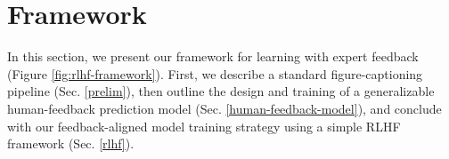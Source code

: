 \documentclass[11pt]{article}
\newcommand{\rev}[1]{\textcolor{blue}{#1}}
\begin{document}



\section{Framework} \label{sec:approach}


In this section, we present our framework for learning with expert feedback (Figure \ref{fig:rlhf-framework}). First, we describe a standard figure-captioning pipeline (Sec. \ref{prelim}), then outline the design and training of a generalizable human-feedback prediction model (Sec. \ref{human-feedback-model}), and conclude with our feedback-aligned model training strategy using a simple RLHF framework (Sec. \ref{rlhf}).
\end{document}
